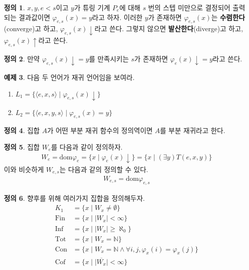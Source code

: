 \documentclass[b5paper, 11pt]{book}
\theoremstyle{definition}
\newtheorem{defn}{정의}[chapter]
\newtheorem{ex}[defn]{예제}
\begin{document}
\begin{defn}
    $x, y, e < s$이고 $y$가 튜링 기계 $P_e$에 대해 $s$ 번의 스텝 미만으로 결정되어 출력되는 결과값이면 $\varphi_{e, s} (x) = y$라고 하자. 이러한 $y$가 존재하면 $\varphi_{e,s} (x)$는 \textbf{수렴한다}(converge)고 하고, $\varphi_{e, s} (x)\downarrow$라고 쓴다. 그렇지 않으면 \textbf{발산한다}(diverge)고 하고, $\varphi_{e, s} (x) \uparrow$라고 쓴다.
\end{defn}
\begin{defn}
    만약 $\varphi_{e, s} (x) \downarrow = y$를 만족시키는 $s$가 존재하면 $\varphi_e (x) \downarrow = y$라고 쓴다.
\end{defn}
\begin{ex}
    다음 두 언어가 재귀 언어임을 보여라.
    \begin{enumerate}
        \item $L_1 = \{\langle e, x, s\rangle \;\vert\; \varphi_{e, s} (x) \downarrow \}$
        \item $L_2 = \{ \langle e, x, y, s \rangle \;\vert\; \varphi_{e, s} (x) = y\}$
    \end{enumerate}
\end{ex}
\begin{defn}
    집합 $A$가 어떤 부분 재귀 함수의 정의역이면 $A$를 부분 재귀라고 한다.
\end{defn}
\begin{defn}    
    집합 $W_e$를 다음과 같이 정의하자.
    \begin{align*}
        W_e = \text{dom} \varphi_e = \{x \;\vert\; \varphi_e (x) \downarrow\} = \{x \;\vert\; (\exists y) T(e,x,y)\}
    \end{align*}
    이와 비슷하게 $W_{e,s}$는 다음과 같의 정의할 수 있다.
    \begin{align*}
        W_{e,s} = \text{dom}\varphi_{e,s}
    \end{align*}
\end{defn}
\begin{defn}
    향후를 위해 여러가지 집합을 정의해두자.
    \begin{align*}
        K_1 &= \{ x \;\vert\; W_x \neq \emptyset \} \\ 
        \mathrm{Fin} &= \{ x \;\vert\; \vert W_x \vert < \infty \} \\ 
        \mathrm{Inf} &= \{ x \;\vert\; \vert W_x \vert \ge \aleph_0 \} \\ 
        \mathrm{Tot} &= \{ x \;\vert\; W_x = \mathbb{N} \} \\ 
        \mathrm{Con} &= \{ x \;\vert\; W_x = \mathbb{N} \wedge \forall i, j, \varphi_x (i) = \varphi_ x (j) \} \\
        \mathrm{Cof} &= \{x \;\vert\; \vert \overline{W_x}\vert < \infty \}
    \end{align*}
\end{defn}
\end{document}
